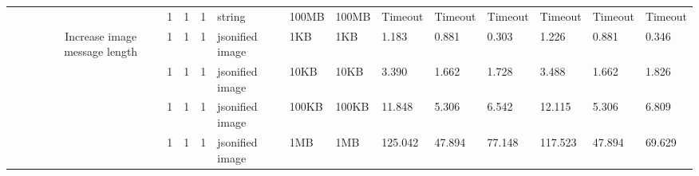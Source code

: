 \begin{landscape}
\begin{table}[]
{\begin{tabular}{@{}ccccllllllllllll@{}}
                                                &                              &                               &                                                 & 1                                        & 1                                          & 1                                 & string                           & 100MB                                         & 100MB                                           & Timeout                 & Timeout  & Timeout                      & Timeout                 & Timeout  & Timeout                      \\
                                                &                              &                               & \multirow{6}{*}{Increase image message length}  & 1                                        & 1                                          & 1                                 & jsonified image                  & 1KB                                           & 1KB                                             & 1.183                   & 0.881    & 0.303                        & 1.226                   & 0.881    & 0.346                        \\
                                                &                              &                               &                                                 & 1                                        & 1                                          & 1                                 & jsonified image                  & 10KB                                          & 10KB                                            & 3.390                   & 1.662    & 1.728                        & 3.488                   & 1.662    & 1.826                        \\
                                                &                              &                               &                                                 & 1                                        & 1                                          & 1                                 & jsonified image                  & 100KB                                         & 100KB                                           & 11.848                  & 5.306    & 6.542                        & 12.115                  & 5.306    & 6.809                        \\
                                                &                              &                               &                                                 & 1                                        & 1                                          & 1                                 & jsonified image                  & 1MB                                           & 1MB                                             & 125.042                 & 47.894   & 77.148                       & 117.523                 & 47.894   & 69.629                       \\

\end{tabular}}
\end{table}
\end{landscape}
